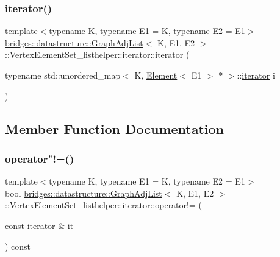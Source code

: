 \subsubsection{\texorpdfstring{iterator()}{iterator()}}
{\footnotesize\ttfamily template$<$typename K, typename E1 = K, typename E2 = E1$>$ \\
\mbox{\hyperlink{classbridges_1_1datastructure_1_1_graph_adj_list}{bridges\+::datastructure\+::\+Graph\+Adj\+List}}$<$ K, E1, E2 $>$\+::Vertex\+Element\+Set\+\_\+listhelper\+::iterator\+::iterator (\begin{DoxyParamCaption}\item[{typename std\+::unordered\+\_\+map$<$ K, \mbox{\hyperlink{classbridges_1_1datastructure_1_1_element}{Element}}$<$ E1 $>$ $\ast$ $>$\+::\mbox{\hyperlink{classbridges_1_1datastructure_1_1_graph_adj_list_1_1_vertex_element_set__listhelper_1_1iterator}{iterator}}}]{i }\end{DoxyParamCaption})\hspace{0.3cm}{\ttfamily [inline]}}



\subsection{Member Function Documentation}
\mbox{\label{classbridges_1_1datastructure_1_1_graph_adj_list_1_1_vertex_element_set__listhelper_1_1iterator_a1df44cf11b2aeec0c37379f6ccc9ebc0}} 
\subsubsection{\texorpdfstring{operator"!=()}{operator!=()}}
{\footnotesize\ttfamily template$<$typename K, typename E1 = K, typename E2 = E1$>$ \\
bool \mbox{\hyperlink{classbridges_1_1datastructure_1_1_graph_adj_list}{bridges\+::datastructure\+::\+Graph\+Adj\+List}}$<$ K, E1, E2 $>$\+::Vertex\+Element\+Set\+\_\+listhelper\+::iterator\+::operator!= (\begin{DoxyParamCaption}\item[{const \mbox{\hyperlink{classbridges_1_1datastructure_1_1_graph_adj_list_1_1_vertex_element_set__listhelper_1_1iterator}{iterator}} \&}]{it }\end{DoxyParamCaption}) const\hspace{0.3cm}{\ttfamily [inline]}}

